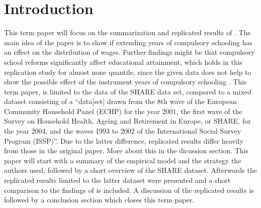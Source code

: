 \documentclass[12pt,a4paper]{article}
\begin{document}
\begin{adjustwidth}{1.5em}{0pt}

\begin{acronym}[dummyyyy]


\end{acronym}

\end{adjustwidth}

\restoregeometry

\newpage
{}
\hypertarget{introduction}{%
\section{Introduction}\label{introduction}}

This term paper will focus on the summarization and replicated results
of \textcite{brunello}. The main idea of the paper is to show if
extending years of compulsory schooling has an effect on the
distribution of wages. Further findings might be that compulsory school
reforms significantly affect educational attainment, which holds in this
replication study for almost none quantile, since the given data does
not help to show the possible effect of the instrument years of
compulsory schooling . This term paper, is limited to the data of the
SHARE data set, compared to a mixed dataset consisting of a
\enquote{data{[}set{]} drawn from the 8th wave of the European Community
Household Panel (ECHP) for the year 2001, the first wave of the Survey
on Household Health, Ageing and Retirement in Europe, or SHARE, for the
year 2004, and the waves 1993 to 2002 of the International Social Survey
Program (ISSP)}\textcite{brunello}. Due to the latter difference,
replicated results differ heavily from those in the original paper. More
about this in the dicussion section. This paper will start with a
summary of the empirical model and the strategy the authors used,
followed by a short overview of the SHARE dataset. Afterwards the
replicated results limited to the latter dataset were presented and a
short comparison to the findings of \textcite{brunello} is included. A
discussion of the replicated results is followed by a conclusion section
which closes this term paper.
\end{document}
